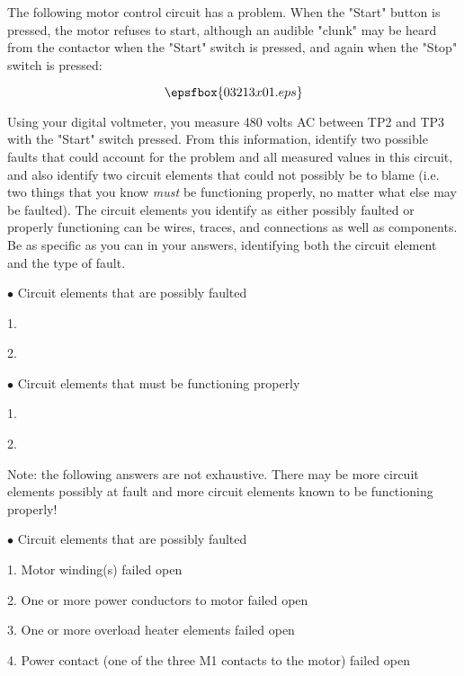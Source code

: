 

The following motor control circuit has a problem.  When the "Start" button is pressed, the motor refuses to start, although an audible "clunk" may be heard from the contactor when the "Start" switch is pressed, and again when the "Stop" switch is pressed:

$$\epsfbox{03213x01.eps}$$

Using your digital voltmeter, you measure 480 volts AC between TP2 and TP3 with the "Start" switch pressed.  From this information, identify two possible faults that could account for the problem and all measured values in this circuit, and also identify two circuit elements that could not possibly be to blame (i.e. two things that you know {\it must} be functioning properly, no matter what else may be faulted).  The circuit elements you identify as either possibly faulted or properly functioning can be wires, traces, and connections as well as components.  Be as specific as you can in your answers, identifying both the circuit element and the type of fault.

\medskip
\goodbreak
\item{$\bullet$} Circuit elements that are possibly faulted
\item{1.}
\item{2.} 
\medskip

\medskip
\goodbreak
\item{$\bullet$} Circuit elements that must be functioning properly
\item{1.} 
\item{2.} 
\medskip







Note: the following answers are not exhaustive.  There may be more circuit elements possibly at fault and more circuit elements known to be functioning properly!

\medskip
\goodbreak
\item{$\bullet$} Circuit elements that are possibly faulted
\item{1.} Motor winding(s) failed open
\item{2.} One or more power conductors to motor failed open
\item{3.} One or more overload heater elements failed open
\item{4.} Power contact (one of the three M1 contacts to the motor) failed open
\medskip

